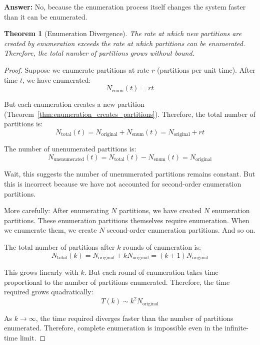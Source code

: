 \documentclass[twocolumn,10pt]{article}
\newtheorem{theorem}{Theorem}[section]
\theoremstyle{definition}
\theoremstyle{remark}
\begin{document}
\vspace{0.2cm}
\noindent\textbf{Answer:} No, because the enumeration process itself changes the system faster than it can be enumerated.

\begin{theorem}[Enumeration Divergence]
\label{thm:enumeration_divergence}
The rate at which new partitions are created by enumeration exceeds the rate at which partitions can be enumerated. Therefore, the total number of partitions grows without bound.
\end{theorem}

\begin{proof}
Suppose we enumerate partitions at rate $r$ (partitions per unit time). After time $t$, we have enumerated:
\begin{equation}
N_{\text{enum}}(t) = rt
\end{equation}

But each enumeration creates a new partition (Theorem~\ref{thm:enumeration_creates_partitions}). Therefore, the total number of partitions is:
\begin{equation}
N_{\text{total}}(t) = N_{\text{original}} + N_{\text{enum}}(t) = N_{\text{original}} + rt
\end{equation}

The number of unenumerated partitions is:
\begin{equation}
N_{\text{unenumerated}}(t) = N_{\text{total}}(t) - N_{\text{enum}}(t) = N_{\text{original}}
\end{equation}

Wait, this suggests the number of unenumerated partitions remains constant. But this is incorrect because we have not accounted for second-order enumeration partitions.

\vspace{0.2cm}
\noindent More carefully: After enumerating $N$ partitions, we have created $N$ enumeration partitions. These enumeration partitions themselves require enumeration. When we enumerate them, we create $N$ second-order enumeration partitions. And so on.

The total number of partitions after $k$ rounds of enumeration is:
\begin{equation}
N_{\text{total}}(k) = N_{\text{original}} + kN_{\text{original}} = (k+1)N_{\text{original}}
\end{equation}

This grows linearly with $k$. But each round of enumeration takes time proportional to the number of partitions enumerated. Therefore, the time required grows quadratically:
\begin{equation}
T(k) \sim k^2 N_{\text{original}}
\end{equation}

As $k \to \infty$, the time required diverges faster than the number of partitions enumerated. Therefore, complete enumeration is impossible even in the infinite-time limit.
\end{proof}
\end{document}
